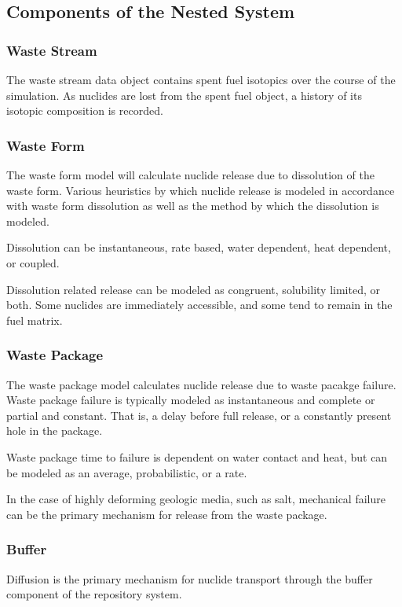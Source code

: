\subsection{Components of the Nested System}
\subsubsection{Waste Stream}
The waste stream data object contains spent fuel isotopics over the 
course of the simulation. As nuclides are lost from the spent fuel 
object, a history of its isotopic composition is recorded. 

\subsubsection{Waste Form}
The waste form model will calculate nuclide release due to dissolution 
of the waste form. Various heuristics by which nuclide release is modeled in 
accordance with waste form dissolution as well as the method by which 
the dissolution is modeled.

Dissolution can be instantaneous, rate based, water dependent, heat 
dependent, or coupled.

Dissolution related release can be modeled as congruent, solubility 
limited, or both. Some nuclides are immediately accessible, and some 
tend to remain in the fuel matrix. 

\subsubsection{Waste Package}
The waste package model calculates nuclide release due to waste 
pacakge failure. Waste package failure is typically modeled as 
instantaneous and complete or partial and constant. That is, a delay 
before full release, or a constantly present hole in the package.

Waste package time to failure is dependent on water contact and heat, 
but can be modeled as an average, probabilistic, or a rate.

In the case of highly deforming geologic media, such as salt, 
mechanical failure can be the primary mechanism for release from the 
waste package.

\subsubsection{Buffer}
Diffusion is the primary mechanism for nuclide transport through the 
buffer component of the repository system.  

